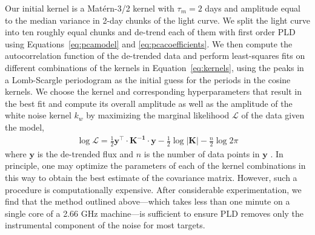 \documentclass[]{emulateapj}
\begin{document}
Our initial kernel is a Mat\'ern-3/2 kernel with $\tau_m = 2$ days and amplitude
equal to the median variance in 2-day chunks of the light curve. We split the light curve
into ten roughly equal chunks and de-trend each of them with first order PLD
using Equations~\ref{eq:pcamodel} and \ref{eq:pcacoefficients}. We then compute the 
autocorrelation function of the de-trended data and perform least-squares fits
on different combinations of the kernels in Equation~\ref{eq:kernels}, using
the peaks in a Lomb-Scargle periodogram as the initial
guess for the periods in the cosine kernels. We choose the kernel and corresponding
hyperparameters that result in the best fit and compute its overall amplitude
as well as the amplitude of the white noise kernel $k_w$
by maximizing the marginal likelihood $\mathcal{L}$ of the data given the model,
\begin{align}
\label{eq:like}
\log\mathcal{L} = \frac{1}{2}\mathbf{y}^\top\cdot\mathbf{K^{-1}}\cdot\mathbf{y} - \frac{1}{2}\log\left|\mathbf{K}\right| - \frac{n}{2}\log 2\pi
\end{align}
where $\mathbf{y}$ is the de-trended flux and $n$ is the number of data points 
in $\mathbf{y}$ \citep{RW06}. In principle, one may optimize the parameters of each
of the kernel combinations in this way to obtain the best estimate of the covariance
matrix. However, such a procedure is computationally expensive. After considerable
experimentation, we find that the method outlined above---which takes less than one
minute on a single core of a 2.66 GHz machine---is sufficient to ensure PLD removes
only the instrumental component of the noise for most targets.
\end{document}
